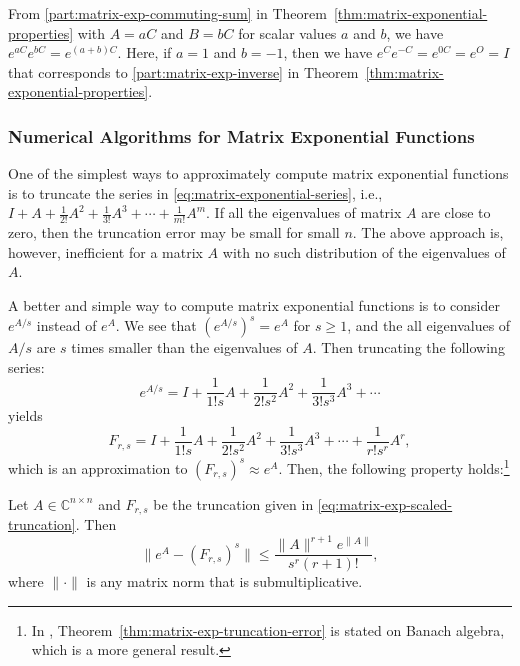 {From \ref{part:matrix-exp-commuting-sum} in Theorem~\ref{thm:matrix-exponential-properties} with $A=aC$ and $B=bC$ for scalar values $a$ and $b$, we have $e^{aC}e^{bC}=e^{(a+b)C}$. Here, if $a=1$ and $b=-1$, then we have $e^Ce^{-C}=e^{0C}=e^O=I$ that corresponds to \ref{part:matrix-exp-inverse} in Theorem~\ref{thm:matrix-exponential-properties}.}

\subsubsection{{Numerical Algorithms for Matrix Exponential Functions}}\label{subsec:matrix-exponential-algorithms}

{One of the simplest ways to approximately compute matrix exponential functions is to truncate the series in \eqref{eq:matrix-exponential-series}, i.e., $I+A+\frac{1}{2!}A^2+\frac{1}{3!}A^3+\cdots+\frac{1}{m!}A^m$. If all the eigenvalues of matrix $A$ are close to zero, then the truncation error may be small for small $n$. The above approach is, however, inefficient for a matrix $A$ with no such distribution of the eigenvalues of $A$.}

{A better and simple way to compute matrix exponential functions is to consider $e^{A/s}$ instead of $e^A$. We see that $(e^{A/s})^s=e^A$ for $s\ge1$, and the all eigenvalues of $A/s$ are $s$ times smaller than the eigenvalues of $A$. Then truncating the following series:}
\begin{equation}\label{eq:matrix-exp-scaled-series}e^{A/s}=I+\frac{1}{1!s}A+\frac{1}{2!s^2}A^2+\frac{1}{3!s^3}A^3+\cdots\end{equation}
{yields}
\begin{equation}\label{eq:matrix-exp-scaled-truncation}F_{r,s}=I+\frac{1}{1!s}A+\frac{1}{2!s^2}A^2+\frac{1}{3!s^3}A^3+\cdots+\frac{1}{r!s^r}A^r,\end{equation}
{which is an approximation to $(F_{r,s})^s\approx e^A$. Then, the following property holds:}\footnote{{In , Theorem~\ref{thm:matrix-exp-truncation-error} is stated on Banach algebra, which is a more general result.}}

\begin{Theorem}{}\label{thm:matrix-exp-truncation-error}
{Let $A\in\mathbb{C}^{n\times n}$ and $F_{r,s}$ be the truncation given in \eqref{eq:matrix-exp-scaled-truncation}. Then}
\begin{equation}\label{eq:matrix-exp-truncation-error}\|e^A-(F_{r,s})^s\|\le\frac{\|A\|^{r+1}e^{\|A\|}}{s^r(r+1)!},\end{equation}
{where $\|\cdot\|$ is any matrix norm that is submultiplicative.}\footnotemark
\end{Theorem}


